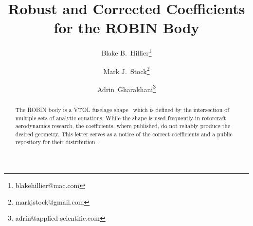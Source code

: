 \documentclass{ahs}
\begin{document}
\title{Robust and Corrected Coefficients for the ROBIN Body}

\author{Blake B.~Hillier\thanks{blakehillier@mac.com}}
\author{Mark J.~Stock\thanks{markjstock@gmail.com}}
\author{Adrin~Gharakhani\thanks{adrin@applied-scientific.com}}

\maketitle

\begin{abstract}
The ROBIN body is a VTOL fuselage shape~
which is defined by the intersection of multiple sets of analytic equations.
While the shape is used frequently in rotorcraft aerodynamics research, the coefficients,
where published, do not reliably produce the desired geometry.
This letter serves as a notice of the correct coefficients and a public repository
for their distribution~.
\end{abstract}

\begin{nomenclature}[$C_{p}$]
\end{nomenclature}
\end{document}
